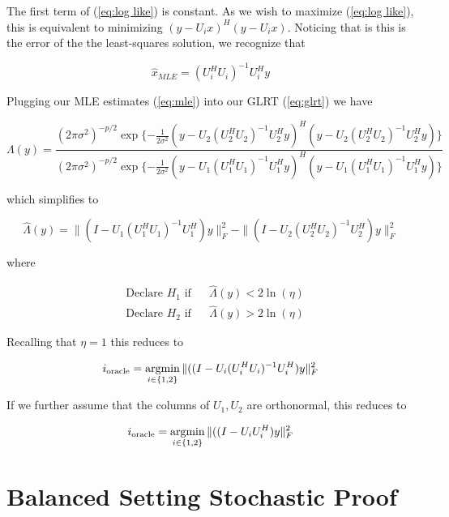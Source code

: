 \documentclass[english]{article}
\begin{document}
The first term of (\ref{eq:log like}) is constant. As we wish to maximize (\ref{eq:log like}), this is equivalent to minimizing $(y-U_ix)^H(y-U_ix)$. Noticing that is this is the error of the the least-squares solution, we recognize that

\begin{equation}\label{eq:mle}
\hat{x}_{MLE} = (U_i^HU_i)^{-1}U_i^Hy
\end{equation}

Plugging our MLE estimates (\ref{eq:mle}) into our GLRT (\ref{eq:glrt}) we have

\begin{equation}
\Lambda(y) = \frac{(2\pi\sigma^2)^{-p/2}\exp\{-\frac{1}{2\sigma^2}(y-U_2(U_2^HU_2)^{-1}U_2^Hy)^H(y-U_2(U_2^HU_2)^{-1}U_2^Hy)\}}{(2\pi\sigma^2)^{-p/2}\exp\{-\frac{1}{2\sigma^2}(y-U_1(U_1^HU_1)^{-1}U_1^Hy)^H(y-U_1(U_1^HU_1)^{-1}U_1^Hy)\}}
\end{equation}

which simplifies to

\begin{equation}
\hat{\Lambda}(y)=\|(I-U_1(U_1^HU_1)^{-1}U_1^H)y\|_F^2 -\|(I-U_2(U_2^HU_2)^{-1}U_2^H)y\|_F^2
\end{equation}

where

\begin{equation}
\begin{aligned}
&\text{Declare } H_1 \text{ if}
&& \hat{\Lambda}(y) < 2\ln(\eta)\\
& \text{Declare } H_2 \text{ if}
&& \hat{\Lambda}(y) > 2\ln(\eta)
\end{aligned}
\end{equation}

Recalling that $\eta=1$ this reduces to

\begin{equation}
i_{\text{oracle}}=\mathop{\rm argmin}_{i\in\{1,2\}}\|((I-U_i(U_i^HU_i)^{-1}U_i^H)y\|_F^2
\end{equation}

If we further assume that the columns of $U_1,U_2$ are orthonormal, this reduces to

\begin{equation}
i_{\text{oracle}}=\mathop{\rm argmin}_{i\in\{1,2\}}\|((I-U_iU_i^H)y\|_F^2
\end{equation}

\section*{Balanced Setting Stochastic Proof}
\end{document}
